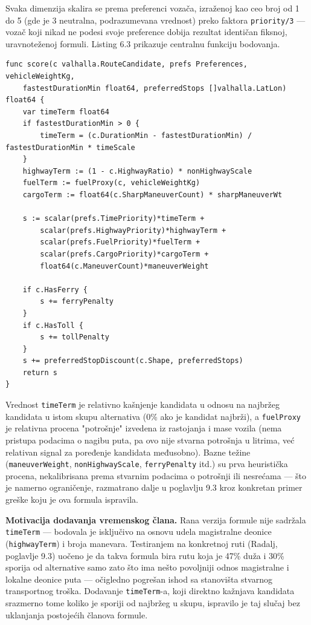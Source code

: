 Svaka dimenzija skalira se prema preferenci vozača, izraženoj kao ceo broj od 1 do 5 (gde je 3 neutralna, podrazumevana vrednost) preko faktora \texttt{priority/3} — vozač koji nikad ne podesi svoje preference dobija rezultat identičan fiksnoj, uravnoteženoj formuli. Listing 6.3 prikazuje centralnu funkciju bodovanja.

\begin{lstlisting}[caption={[Funkcija bodovanja rute]Funkcija bodovanja rute (\texttt{backend/internal/scoring/scoring.go}) — manji rezultat je bolji}]
func score(c valhalla.RouteCandidate, prefs Preferences, vehicleWeightKg,
	fastestDurationMin float64, preferredStops []valhalla.LatLon) float64 {
	var timeTerm float64
	if fastestDurationMin > 0 {
		timeTerm = (c.DurationMin - fastestDurationMin) / fastestDurationMin * timeScale
	}
	highwayTerm := (1 - c.HighwayRatio) * nonHighwayScale
	fuelTerm := fuelProxy(c, vehicleWeightKg)
	cargoTerm := float64(c.SharpManeuverCount) * sharpManeuverWt

	s := scalar(prefs.TimePriority)*timeTerm +
		scalar(prefs.HighwayPriority)*highwayTerm +
		scalar(prefs.FuelPriority)*fuelTerm +
		scalar(prefs.CargoPriority)*cargoTerm +
		float64(c.ManeuverCount)*maneuverWeight

	if c.HasFerry {
		s += ferryPenalty
	}
	if c.HasToll {
		s += tollPenalty
	}
	s += preferredStopDiscount(c.Shape, preferredStops)
	return s
}
\end{lstlisting}

Vrednost \texttt{timeTerm} je relativno kašnjenje kandidata u odnosu na najbržeg kandidata u istom skupu alternativa (0\% ako je kandidat najbrži), a \texttt{fuelProxy} je relativna procena "potrošnje" izvedena iz rastojanja i mase vozila (nema pristupa podacima o nagibu puta, pa ovo nije stvarna potrošnja u litrima, već relativan signal za poređenje kandidata međusobno). Bazne težine (\texttt{maneuverWeight}, \texttt{nonHighwayScale}, \texttt{ferryPenalty} itd.) su prva heuristička procena, nekalibrisana prema stvarnim podacima o potrošnji ili nesrećama — što je namerno ograničenje, razmatrano dalje u poglavlju 9.3 kroz konkretan primer greške koju je ova formula ispravila.

\textbf{Motivacija dodavanja vremenskog člana.} Rana verzija formule nije sadržala \texttt{timeTerm} — bodovala je isključivo na osnovu udela magistralne deonice (\texttt{highwayTerm}) i broja manevara. Testiranjem na konkretnoj ruti (Radalj, poglavlje 9.3) uočeno je da takva formula bira rutu koja je 47\% duža i 30\% sporija od alternative samo zato što ima nešto povoljniji odnos magistralne i lokalne deonice puta — očigledno pogrešan ishod sa stanovišta stvarnog transportnog troška. Dodavanje \texttt{timeTerm}-a, koji direktno kažnjava kandidata srazmerno tome koliko je sporiji od najbržeg u skupu, ispravilo je taj slučaj bez uklanjanja postojećih članova formule.

